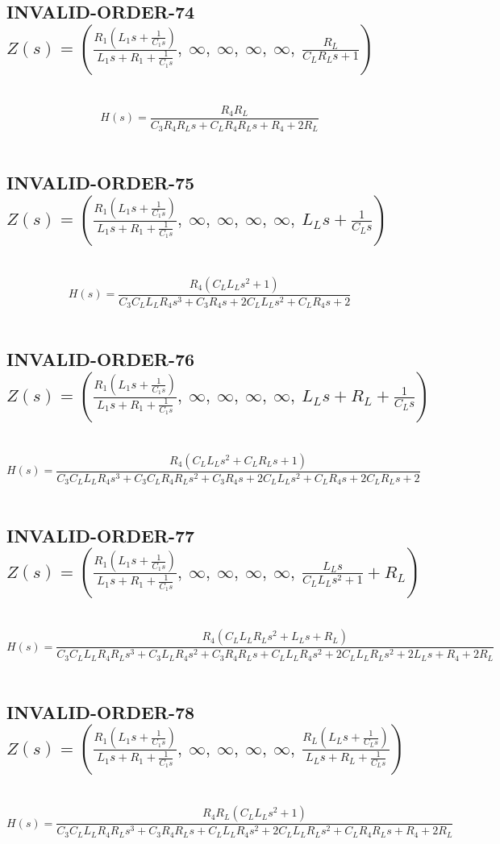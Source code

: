 \documentclass{article}
\begin{document}
\subsection{INVALID-ORDER-74 $Z(s) = \left( \frac{R_{1} \left(L_{1} s + \frac{1}{C_{1} s}\right)}{L_{1} s + R_{1} + \frac{1}{C_{1} s}}, \  \infty, \  \infty, \  \infty, \  \infty, \  \frac{R_{L}}{C_{L} R_{L} s + 1}\right)$ } \ 
\textbf{\[H(s) = \frac{R_{4} R_{L}}{C_{3} R_{4} R_{L} s + C_{L} R_{4} R_{L} s + R_{4} + 2 R_{L}}\] } \ 
\subsection{INVALID-ORDER-75 $Z(s) = \left( \frac{R_{1} \left(L_{1} s + \frac{1}{C_{1} s}\right)}{L_{1} s + R_{1} + \frac{1}{C_{1} s}}, \  \infty, \  \infty, \  \infty, \  \infty, \  L_{L} s + \frac{1}{C_{L} s}\right)$ } \ 
\textbf{\[H(s) = \frac{R_{4} \left(C_{L} L_{L} s^{2} + 1\right)}{C_{3} C_{L} L_{L} R_{4} s^{3} + C_{3} R_{4} s + 2 C_{L} L_{L} s^{2} + C_{L} R_{4} s + 2}\] } \ 
\subsection{INVALID-ORDER-76 $Z(s) = \left( \frac{R_{1} \left(L_{1} s + \frac{1}{C_{1} s}\right)}{L_{1} s + R_{1} + \frac{1}{C_{1} s}}, \  \infty, \  \infty, \  \infty, \  \infty, \  L_{L} s + R_{L} + \frac{1}{C_{L} s}\right)$ } \ 
\textbf{\[H(s) = \frac{R_{4} \left(C_{L} L_{L} s^{2} + C_{L} R_{L} s + 1\right)}{C_{3} C_{L} L_{L} R_{4} s^{3} + C_{3} C_{L} R_{4} R_{L} s^{2} + C_{3} R_{4} s + 2 C_{L} L_{L} s^{2} + C_{L} R_{4} s + 2 C_{L} R_{L} s + 2}\] } \ 
\subsection{INVALID-ORDER-77 $Z(s) = \left( \frac{R_{1} \left(L_{1} s + \frac{1}{C_{1} s}\right)}{L_{1} s + R_{1} + \frac{1}{C_{1} s}}, \  \infty, \  \infty, \  \infty, \  \infty, \  \frac{L_{L} s}{C_{L} L_{L} s^{2} + 1} + R_{L}\right)$ } \ 
\textbf{\[H(s) = \frac{R_{4} \left(C_{L} L_{L} R_{L} s^{2} + L_{L} s + R_{L}\right)}{C_{3} C_{L} L_{L} R_{4} R_{L} s^{3} + C_{3} L_{L} R_{4} s^{2} + C_{3} R_{4} R_{L} s + C_{L} L_{L} R_{4} s^{2} + 2 C_{L} L_{L} R_{L} s^{2} + 2 L_{L} s + R_{4} + 2 R_{L}}\] } \ 
\subsection{INVALID-ORDER-78 $Z(s) = \left( \frac{R_{1} \left(L_{1} s + \frac{1}{C_{1} s}\right)}{L_{1} s + R_{1} + \frac{1}{C_{1} s}}, \  \infty, \  \infty, \  \infty, \  \infty, \  \frac{R_{L} \left(L_{L} s + \frac{1}{C_{L} s}\right)}{L_{L} s + R_{L} + \frac{1}{C_{L} s}}\right)$ } \ 
\textbf{\[H(s) = \frac{R_{4} R_{L} \left(C_{L} L_{L} s^{2} + 1\right)}{C_{3} C_{L} L_{L} R_{4} R_{L} s^{3} + C_{3} R_{4} R_{L} s + C_{L} L_{L} R_{4} s^{2} + 2 C_{L} L_{L} R_{L} s^{2} + C_{L} R_{4} R_{L} s + R_{4} + 2 R_{L}}\] } \ 
\end{document}
